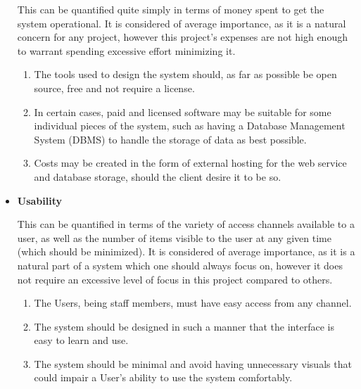 \documentclass[hidelinks,a4paper,12pt]{article}
\begin{document}
\begin{itemize}
				This can be quantified quite simply in terms of money spent to get the system operational. It is considered of average importance, as it is a natural concern for any project, however this project's expenses are not high enough to warrant spending excessive effort minimizing it.
				\begin{enumerate}
					\item The tools used to design the system should, as far as possible be open source, free and not require a license.
					\item In certain cases, paid and licensed software may be suitable for some individual pieces of the system, such as having a Database Management System (DBMS) to handle the storage of data as best possible.
					\item Costs may be created in the form of external hosting for the web service and database storage, should the client desire it to be so.
				\end{enumerate}
				\item \textbf{Usability}
				
				This can be quantified in terms of the variety of access channels available to a user, as well as the number of items visible to the user at any given time (which should be minimized). It is considered of average importance, as it is a natural part of a system which one should always focus on, however it does not require an excessive level of focus in this project compared to others.
				\begin{enumerate}
					\item The Users, being staff members, must have easy access from any channel.
					\item The system should be designed in such a manner that the interface is easy to learn and use.
					\item The system should be minimal and avoid having unnecessary visuals that could impair a User's ability to use the system comfortably.
				\end{enumerate}
			\end{itemize}
\end{document}
